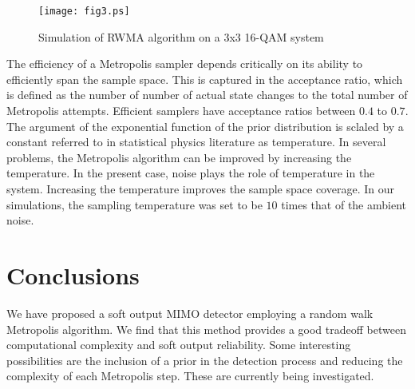 \documentclass[pre,12pt,aps]{revtex4}
\begin{document}
\begin{figure}
\centering
\texttt{[image: fig3.ps]}
\caption{
Simulation of RWMA algorithm on a 
3x3 16-QAM system
}
\end{figure}

The efficiency of a Metropolis sampler depends 
critically on its ability to efficiently span 
the sample space. This is captured in the 
acceptance ratio, which is defined as the 
number of number of actual state changes to 
the total number of Metropolis attempts. 
Efficient samplers have acceptance ratios 
between $0.4$ to  $0.7$. 
The argument of the exponential function 
of the prior distribution is sclaled by 
a constant referred to in statistical physics literature as
temperature. 
In several problems, the Metropolis algorithm can 
be improved by increasing the temperature. 
In 
the present case, noise plays the role of 
temperature in the system. Increasing the 
temperature improves the sample space coverage. 
In our simulations, the sampling 
temperature was set to be $10$ times that of 
the ambient noise. 


\section{Conclusions}
We have proposed a soft output MIMO detector employing 
a random walk Metropolis algorithm. We find that this method
provides a good tradeoff between computational complexity 
and soft output reliability. Some interesting 
possibilities are the inclusion of a prior in the 
detection process and reducing the complexity of 
each Metropolis step. These are currently being 
investigated.
\end{document}
